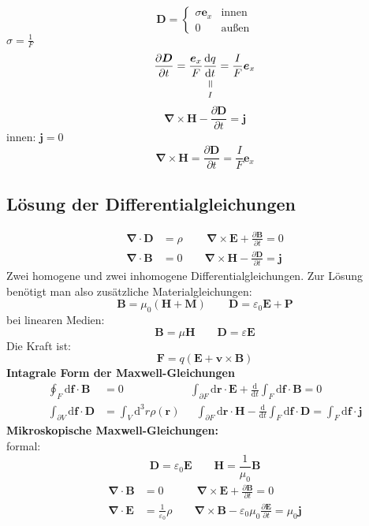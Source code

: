 \documentclass[titlepage,11pt,a4paper,ngerman]{report}
\newcommand{\tx}[1]{\textrm{#1}}
\newcommand{\dd}{\tx{d}}
\newcommand{\verteq}{\rotatebox{90}{$\,=$}}
\newcommand{\equalto}[2]{\underset{\scriptstyle\overset{\mkern4mu\verteq}{#2}}{#1}}
\newcommand{\casess}[4]{\left\{ \begin{array}{ll} {#1} & {#2} \\ {#3} & {#4} \end{array} \right.}
\newcommand{\prt}[2]{\frac{\partial #1}{\partial #2}}
\newcommand{\prd}[2]{\frac{\tx{d} #1}{\tx{d} #2}}
\renewcommand{\vec}[1]{\boldsymbol{#1}}
\renewcommand{\epsilon}{\varepsilon}
\newcommand{\vabla}{\boldsymbol{\nabla}}
\begin{document}

\begin{equation*}
\vec{D} = \casess{\sigma \vec{e}_x}{\tx{innen}}{0}{\tx{außen}}
\end{equation*}
$ \sigma = \frac{1}{F} $
\begin{equation*}
\prt{\vec{D}}{t} = \frac{\vec{e}_x}{F} \equalto{\prd{q}{t}}{I} = \frac{I}{F} \vec{e}_x
\end{equation*}
\begin{equation*}
\vabla \times \vec{H} - \prt{\vec{D}}{t} = \vec{j}
\end{equation*}
innen: $ \vec{j} = 0 $
\begin{equation*}
\vabla \times \vec{H} = \prt{\vec{D}}{t} =  \frac{I}{F} \vec{e}_x
\end{equation*}

\subsection{Lösung der Differentialgleichungen} %

\begin{align*}
\vabla \cdot \vec{D} &= \rho \qquad \, \vabla \times \vec{E} + \prt{\vec{B}}{t} = 0 \\
\vabla \cdot \vec{B} &= 0 \qquad \vabla \times \vec{H} - \prt{\vec{D}}{t} = \vec{j}
\end{align*}
Zwei homogene und zwei inhomogene Differentialgleichungen. Zur Lösung benötigt man also zusätzliche Materialgleichungen:
\begin{equation*}
\vec{B} = \mu_0 (\vec{H} + \vec{M}) \qquad \vec{D} = \epsilon_0\vec{E} + \vec{P}
\end{equation*}
bei linearen Medien:
\begin{equation*}
\vec{B} = \mu \vec{H} \qquad \vec{D} = \epsilon \vec{E}
\end{equation*}
Die Kraft ist:
\begin{equation*}
\vec{F} = q (\vec{E} + \vec{v} \times \vec{B})
\end{equation*}
\textbf{Intagrale Form der Maxwell-Gleichungen}
\begin{align*}
\oint_F \dd \vec{f} \cdot \vec{B} &= 0  \qquad \qquad \qquad \int_{\partial F} \dd \vec{r} \cdot \vec{E} + \prd{}{t} \int_F \dd \vec{f} \cdot \vec{B} = 0 \\
\int_{\partial V} \dd \vec{f} \cdot \vec{D} &= \int_V \dd^3 r \rho(\vec{r}) \quad \ \ \int_{\partial F} \dd \vec{r} \cdot \vec{H} - \prd{}{t} \int_F \dd \vec{f} \cdot \vec{D} = \int_F \dd \vec{f} \cdot \vec{j}
\end{align*}
\textbf{Mikroskopische Maxwell-Gleichungen:}\\
formal:
\begin{equation*}
\vec{D} = \epsilon_0 \vec{E} \qquad \vec{H} = \frac{1}{\mu_0} \vec{B}
\end{equation*}
\begin{align*}
\vabla \cdot \vec{B} &= 0 \qquad \quad \vabla \times \vec{E} + \prt{\vec{B}}{t} = 0\\
\vabla \cdot \vec{E} &= \frac{1}{\epsilon_0} \rho \qquad \vabla \times \vec{B} - \epsilon_0 \mu_0 \prt{\vec{E}}{t} = \mu_0 \vec{j}
\end{align*}
\end{document}
